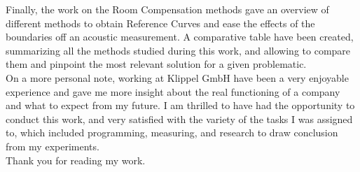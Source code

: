 \documentclass{report}
\begin{document}
Finally, the work on the Room Compensation methods gave an overview of different methods to obtain Reference Curves and ease the effects of the boundaries off an acoustic measurement. A comparative table have been created, summarizing all the methods studied during this work, and allowing to compare them and pinpoint the most relevant solution for a given problematic. \\

On a more personal note, working at Klippel GmbH have been a very enjoyable experience and gave me more insight about the real functioning of a company and what to expect from my future. I am thrilled to have had the opportunity to conduct this work, and very satisfied with the variety of the tasks I was assigned to, which included programming, measuring, and research to draw conclusion from my experiments. \\

Thank you for reading my work.

\renewcommand{\bibname}{References}



\nocite{*}

\end{document}
